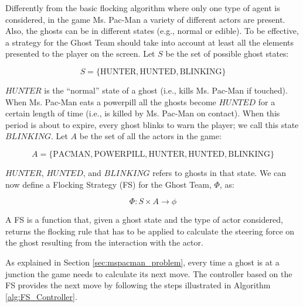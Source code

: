 \documentclass{llncs}
\begin{document}
Differently from the basic flocking algorithm where only one type of agent is considered, in the game Ms. Pac-Man a variety of different actors are present. Also, the ghosts can be in different states (e.g., normal or edible). To be effective, a strategy for the Ghost Team should take into account at least all the elements presented to the player on the screen. Let $S$ be the set of possible ghost states:
\begin{small}
\begin{equation}
S=\{\mathrm{HUNTER}, \mathrm{HUNTED}, \mathrm{BLINKING}\}
\end{equation}
\end{small}
$HUNTER$ is the ``normal'' state of a ghost (i.e., kills Ms. Pac-Man if touched). When Ms. Pac-Man eats a powerpill all the ghosts become $HUNTED$ for a certain length of time (i.e., is killed by Ms. Pac-Man on contact). When this period is about to expire, every ghost blinks to warn the player; we call this state $BLINKING$. Let $A$ be the set of all the actors in the game:
\begin{small}
$$A=\{\mathrm{PACMAN}, \mathrm{POWERPILL}, \mathrm{HUNTER}, \mathrm{HUNTED}, \mathrm{BLINKING}\}$$
\end{small}
$HUNTER$, $HUNTED$, and $BLINKING$ refers to ghosts in that state. We can now define a Flocking Strategy (FS) for the Ghost Team, $\Phi$, as:
\begin{small}
$$\Phi : S \times A \to \phi$$
\end{small}
A FS is a function that, given a ghost state and the type of actor considered, returns the flocking rule that has to be applied to calculate the steering force on the ghost resulting from the interaction with the actor.

As explained in Section \ref{sec:mspacman_problem}, every time a ghost is at a junction the game needs to calculate its next move. The controller based on the FS provides the next move by following the steps illustrated in Algorithm \ref{alg:FS_Controller}.
\end{document}
